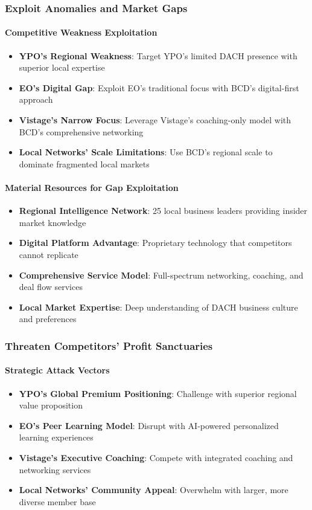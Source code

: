 \subsubsection{Exploit Anomalies and Market Gaps}

\paragraph{Competitive Weakness Exploitation}
\begin{itemize}
    \item \textbf{YPO's Regional Weakness}: Target YPO's limited DACH presence with superior local expertise
    \item \textbf{EO's Digital Gap}: Exploit EO's traditional focus with BCD's digital-first approach
    \item \textbf{Vistage's Narrow Focus}: Leverage Vistage's coaching-only model with BCD's comprehensive networking
    \item \textbf{Local Networks' Scale Limitations}: Use BCD's regional scale to dominate fragmented local markets
\end{itemize}

\paragraph{Material Resources for Gap Exploitation}
\begin{itemize}
    \item \textbf{Regional Intelligence Network}: 25 local business leaders providing insider market knowledge
    \item \textbf{Digital Platform Advantage}: Proprietary technology that competitors cannot replicate
    \item \textbf{Comprehensive Service Model}: Full-spectrum networking, coaching, and deal flow services
    \item \textbf{Local Market Expertise}: Deep understanding of DACH business culture and preferences
\end{itemize}

\subsubsection{Threaten Competitors' Profit Sanctuaries}

\paragraph{Strategic Attack Vectors}
\begin{itemize}
    \item \textbf{YPO's Global Premium Positioning}: Challenge with superior regional value proposition
    \item \textbf{EO's Peer Learning Model}: Disrupt with AI-powered personalized learning experiences
    \item \textbf{Vistage's Executive Coaching}: Compete with integrated coaching and networking services
    \item \textbf{Local Networks' Community Appeal}: Overwhelm with larger, more diverse member base
\end{itemize}

